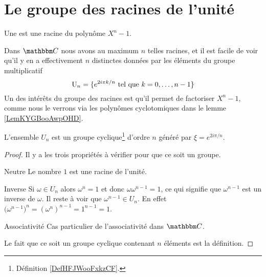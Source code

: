 \section{Le groupe des racines de l'unité}
\label{SecGJOLooWdMYVl}

\begin{definition}
    Une  est une racine du polynôme \( X^n-1\).
\end{definition}

Dans \( \eC\) nous avons au maximum \( n\) telles racines, et il est facile de voir qu'il y en a effectivement \( n\) distinctes données par les éléments du groupe multiplicatif
\begin{equation}        \label{EqIEAXooIpvFPe}
    \operatorname{U}_n=\{  e^{2i\pi k/n}  \text{ tel que } k=0,\ldots, n-1 \}
\end{equation}
Un des intérêts du groupe des racines est qu'il permet de factoriser \( X^n-1\), comme nous le verrons via les polynômes cyclotomiques dans le lemme \ref{LemKYGBooAwpOHD}.

\begin{lemma}       \label{LemWHQGooXyeJiw}
    L'ensemble \( U_n\) est un groupe cyclique\footnote{Définition \ref{DefHFJWooFxkzCF}.} d'ordre \( n\) généré par \( \xi= e^{2i\pi/n}\).
\end{lemma}

\begin{proof}
    Il y a les trois propriétés à vérifier pour que ce soit un groupe.
    \begin{subproof}
        \item[Neutre]
            Le nombre \( 1\) est une racine de l'unité.
    \item[Inverse]
        Si \( \omega\in U_n\) alors \( \omega^n=1\) et donc \( \omega\omega^{n-1}=1\), ce qui signifie que \( \omega^{n-1}\) est un inverse de \( \omega\). Il reste à voir que \( \omega^{n-1}\in U_n\). En effet \(  \big( \omega^{n-1} \big)^n=(\omega^n)^{n-1}=1^{n-1}=1  \).
    \item[Associativité]
        Cas particulier de l'associativité dans \( \eC\).
    \end{subproof}
    Le fait que ce soit un groupe cyclique contenant \( n\) éléments est la définition.
\end{proof}



